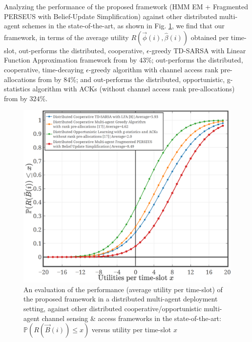 \documentclass[12pt, draftcls, onecolumn]{IEEEtran}
\begin{document}
Analyzing the performance of the proposed framework (HMM EM + Fragmented PERSEUS with Belief-Update Simplification) against other distributed multi-agent schemes in the state-of-the-art, as shown in Fig. \ref{fig: Z. 2}, we find that our framework, in terms of the average utility $R(\vec{\phi}(i), \hat{\beta}(i))$ obtained per time-slot, out-performs the distributed, cooperative, $\epsilon$-greedy TD-SARSA with Linear Function Approximation framework from \cite{WCL:5} by $43$\%; out-performs the distributed, cooperative, time-decaying $\epsilon$-greedy algorithm with channel access rank pre-allocations from \cite{WCL:MIT} by $84$\%; and out-performs the distributed, opportunistic, g-statistics algorithm with ACKs (without channel access rank pre-allocations) from \cite{WCL:MIT} by $324$\%.
\begin{figure} [t]
    \centerline{
    \includegraphics[width = 1.0\linewidth]{figures/Minerva_MultiAgent_SoA_Performance.png}}
    \vspace{-6mm}
    \caption{An evaluation of the performance (average utility per time-slot) of the proposed framework in a distributed multi-agent deployment setting, against other distributed cooperative/opportunistic multi-agent channel sensing \& access frameworks in the state-of-the-art: $\mathbb{P}(R(\vec{B}(i)){\leq}x)$ versus utility per time-slot $x$}
    \vspace{-7mm}
    \label{fig: Z. 2}
\end{figure}
\end{document}

